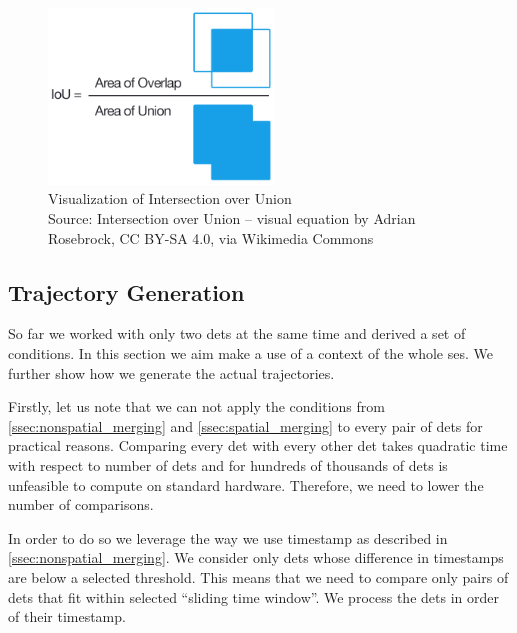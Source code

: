 \begin{figure}
    \centering
    \includegraphics[width=6cm]{img/Intersection_over_Union_-_visual_equation.png}
    \caption[Visualization of Intersection over Union]{Visualization of Intersection over Union\\Source: Intersection over Union -- visual equation\protect\footnotemark{} by Adrian Rosebrock, CC BY-SA 4.0,\footnotemark{} via Wikimedia Commons}
    \label{fig:iou}
\end{figure}
\addtocounter{footnote}{-2}


\subsection{Trajectory Generation}

\label{ssec:trajectory_generation}

So far we worked with only two \glspl{det} at the same time and derived a set of conditions. In this section we aim make a use of a context of the whole \gls{ses}. We further show how we generate the actual trajectories.

Firstly, let us note that we can not apply the conditions from \autoref{ssec:nonspatial_merging} and \autoref{ssec:spatial_merging} to every pair of \glspl{det} for practical reasons. Comparing every \gls{det} with every other \gls{det} takes quadratic time with respect to number of \glspl{det} and for hundreds of thousands of \glspl{det} is unfeasible to compute on standard hardware. Therefore, we need to lower the number of comparisons.

In order to do so we leverage the way we use timestamp as described in \autoref{ssec:nonspatial_merging}. We consider only \glspl{det} whose difference in timestamps are below a selected threshold. This means that we need to compare only pairs of \glspl{det} that fit within selected ``sliding time window''. We process the \glspl{det} in order of their timestamp.


